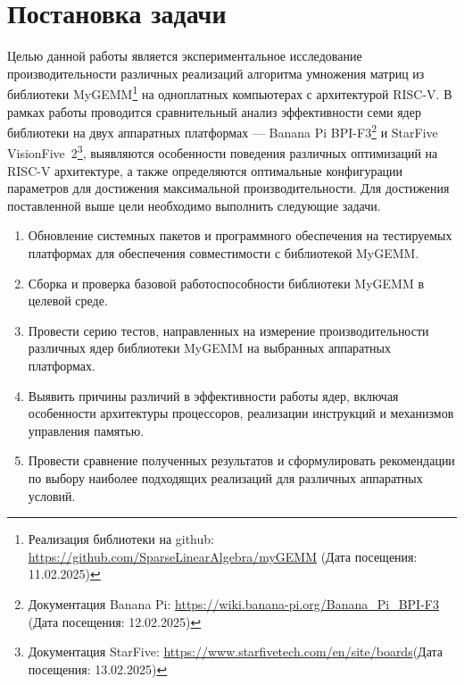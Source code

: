 
\section{Постановка задачи}
\label{sec:task}

Целью данной работы является экспериментальное исследование производительности различных реализаций алгоритма умножения матриц из библиотеки MyGEMM\footnote{Реализация библиотеки на github: \url{https://github.com/SparseLinearAlgebra/myGEMM} (Дата посещения: 11.02.2025)} на одноплатных компьютерах с архитектурой RISC-V. В рамках работы проводится сравнительный анализ эффективности семи ядер библиотеки на двух аппаратных платформах --- Banana Pi BPI-F3\footnote{Документация Banana Pi: \url{https://wiki.banana-pi.org/Banana_Pi_BPI-F3} (Дата посещения: 12.02.2025)} и StarFive VisionFive~2\footnote{Документация StarFive: \url{https://www.starfivetech.com/en/site/boards}(Дата посещения: 13.02.2025)}, выявляются особенности поведения различных оптимизаций на RISC-V архитектуре, а также определяются оптимальные конфигурации параметров для достижения максимальной производительности. Для достижения поставленной выше цели необходимо выполнить следующие задачи.
\begin{enumerate}
    \item Обновление системных пакетов и программного обеспечения на тестируемых платформах для обеспечения совместимости с библиотекой MyGEMM.
    \item Сборка и проверка базовой работоспособности библиотеки MyGEMM в целевой среде.
    \item Провести серию тестов, направленных на измерение производительности различных ядер библиотеки MyGEMM на выбранных аппаратных платформах.
    \item Выявить причины различий в эффективности работы ядер, включая особенности архитектуры процессоров, реализации инструкций и механизмов управления памятью.
    \item Провести сравнение полученных результатов и сформулировать рекомендации по выбору наиболее подходящих реализаций для различных аппаратных условий.
\end{enumerate}